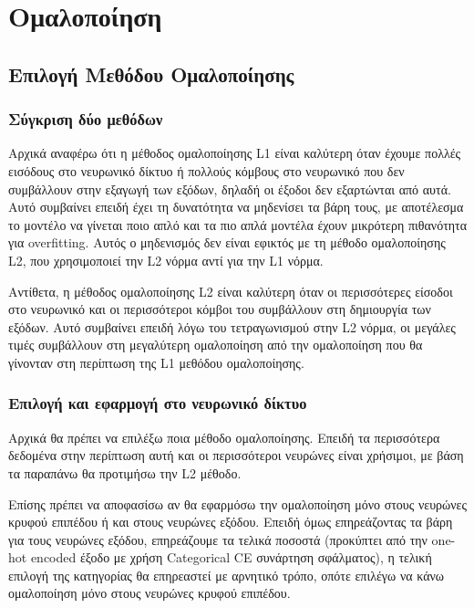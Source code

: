 \documentclass[12pt,a4paper]{article}
\begin{document}
\section{Ομαλοποίηση}

\subsection{Επιλογή Μεθόδου Ομαλοποίησης}

\subsubsection{Σύγκριση δύο μεθόδων}
Αρχικά αναφέρω ότι η μέθοδος ομαλοποίησης L1 είναι καλύτερη όταν έχουμε πολλές εισόδους στο νευρωνικό δίκτυο ή πολλούς κόμβους στο νευρωνικό που δεν συμβάλλουν στην εξαγωγή των εξόδων, δηλαδή οι έξοδοι δεν εξαρτώνται από αυτά. Αυτό συμβαίνει επειδή έχει τη δυνατότητα να μηδενίσει τα βάρη τους, με αποτέλεσμα το μοντέλο να γίνεται ποιο απλό και τα πιο απλά μοντέλα έχουν μικρότερη πιθανότητα για overfitting. Αυτός ο μηδενισμός δεν είναι εφικτός με τη μέθοδο ομαλοποίησης L2, που χρησιμοποιεί την L2 νόρμα αντί για την L1 νόρμα.

Αντίθετα, η μέθοδος ομαλοποίησης L2 είναι καλύτερη όταν οι περισσότερες είσοδοι στο νευρωνικό και οι περισσότεροι κόμβοι του συμβάλλουν στη δημιουργία των εξόδων. Αυτό συμβαίνει επειδή λόγω του τετραγωνισμού στην L2 νόρμα, οι μεγάλες τιμές συμβάλλουν στη μεγαλύτερη ομαλοποίηση από την ομαλοποίηση που θα γίνονταν στη περίπτωση της L1 μεθόδου ομαλοποίησης.

\subsubsection{Επιλογή και εφαρμογή στο νευρωνικό δίκτυο}

Αρχικά θα πρέπει να επιλέξω ποια μέθοδο ομαλοποίησης. Επειδή τα περισσότερα δεδομένα στην περίπτωση αυτή και οι περισσότεροι νευρώνες είναι χρήσιμοι, με βάση τα παραπάνω θα προτιμήσω την L2 μέθοδο.

Επίσης πρέπει να αποφασίσω αν θα εφαρμόσω την ομαλοποίηση μόνο στους νευρώνες κρυφού επιπέδου ή και στους νευρώνες εξόδου. Επειδή όμως επηρεάζοντας τα βάρη για τους νευρώνες εξόδου, επηρεάζουμε τα τελικά ποσοστά (προκύπτει από την one-hot encoded έξοδο με χρήση Categorical CE συνάρτηση σφάλματος), η τελική επιλογή της κατηγορίας θα επηρεαστεί με αρνητικό τρόπο, οπότε επιλέγω να κάνω ομαλοποίηση μόνο στους νευρώνες κρυφού επιπέδου.
\end{document}
